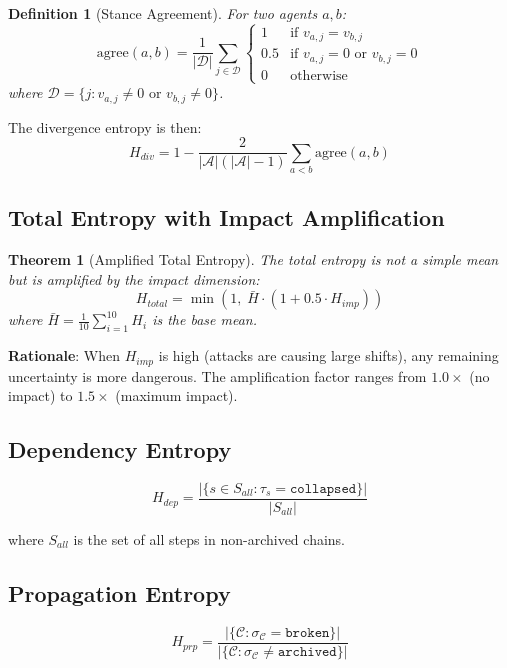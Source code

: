 \documentclass[11pt,a4paper]{article}
\newtheorem{definition}{Definition}
\newtheorem{theorem}{Theorem}
\begin{document}
\begin{definition}[Stance Agreement]
For two agents $a, b$:
$$\text{agree}(a, b) = \frac{1}{|\mathcal{D}|} \sum_{j \in \mathcal{D}} \begin{cases}
1 & \text{if } v_{a,j} = v_{b,j} \\
0.5 & \text{if } v_{a,j} = 0 \text{ or } v_{b,j} = 0 \\
0 & \text{otherwise}
\end{cases}$$
where $\mathcal{D} = \{j : v_{a,j} \neq 0 \text{ or } v_{b,j} \neq 0\}$.
\end{definition}

The divergence entropy is then:
$$H_{div} = 1 - \frac{2}{|\mathcal{A}|(|\mathcal{A}|-1)} \sum_{a < b} \text{agree}(a, b)$$

\subsection{Total Entropy with Impact Amplification}

\begin{theorem}[Amplified Total Entropy]
The total entropy is not a simple mean but is amplified by the impact dimension:
$$H_{total} = \min\left(1, \; \bar{H} \cdot (1 + 0.5 \cdot H_{imp})\right)$$
where $\bar{H} = \frac{1}{10}\sum_{i=1}^{10} H_i$ is the base mean.
\end{theorem}

\textbf{Rationale}: When $H_{imp}$ is high (attacks are causing large shifts), any remaining uncertainty is more dangerous. The amplification factor ranges from $1.0\times$ (no impact) to $1.5\times$ (maximum impact).

\subsection{Dependency Entropy}

$$H_{dep} = \frac{|\{s \in S_{all} : \tau_s = \texttt{collapsed}\}|}{|S_{all}|}$$

where $S_{all}$ is the set of all steps in non-archived chains.

\subsection{Propagation Entropy}

$$H_{prp} = \frac{|\{\mathcal{C} : \sigma_\mathcal{C} = \texttt{broken}\}|}{|\{\mathcal{C} : \sigma_\mathcal{C} \neq \texttt{archived}\}|}$$
\end{document}
